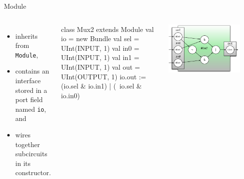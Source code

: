 \documentclass[xcolor=pdflatex,dvipsnames,table]{beamer}
\begin{document}
\begin{frame}[fragile]{Module}

\begin{columns}

\begin{itemize}
\item inherits from \verb+Module+,
\item contains an interface stored in a port field named \verb+io+, and
\item wires together subcircuits in its constructor.
\end{itemize}

\begin{scala}
class Mux2 extends Module {
  val io = new Bundle{
    val sel = UInt(INPUT, 1)
    val in0 = UInt(INPUT, 1)
    val in1 = UInt(INPUT, 1)
    val out = UInt(OUTPUT, 1)
  }
  io.out := (io.sel & io.in1) | 
            (~io.sel & io.in0)
}
\end{scala}


\begin{center}
\includegraphics[width=0.9\textwidth]{figs/mux2-component.pdf} 
\end{center}

\end{columns}

\end{frame}
\end{document}
